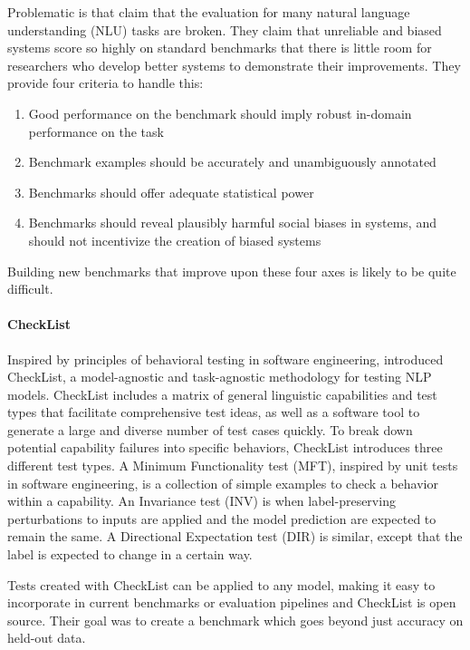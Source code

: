 \documentclass[
]{krantz}
\providecommand{\tightlist}{%
  \setlength{\itemsep}{0pt}\setlength{\parskip}{0pt}}
\begin{document}
Problematic is that \citet{bowman2021will} claim that the evaluation for many natural language understanding (NLU) tasks are broken. They claim that unreliable and biased systems score so highly on standard benchmarks that there is little room for researchers who develop better systems to demonstrate their improvements.
They provide four criteria to handle this:

\begin{enumerate}
\def\labelenumi{\arabic{enumi}.}
\tightlist
\item
  Good performance on the benchmark should imply robust in-domain performance on the task
\item
  Benchmark examples should be accurately and unambiguously annotated
\item
  Benchmarks should offer adequate statistical power
\item
  Benchmarks should reveal plausibly harmful social biases in systems, and should not incentivize the creation of biased systems
\end{enumerate}

Building new benchmarks that improve upon these four axes is likely to be quite difficult.

\hypertarget{checklist}{%
\paragraph{CheckList}\label{checklist}}

Inspired by principles of behavioral testing in software engineering, \citet{ribeiro2020beyond} introduced CheckList, a model-agnostic and task-agnostic methodology for testing NLP models. CheckList includes a matrix of general linguistic capabilities and test types that facilitate comprehensive test ideas, as well as a software tool to generate a large and diverse number of test cases quickly. To break down potential capability failures into specific behaviors, CheckList introduces three different test types. A Minimum Functionality test (MFT), inspired by unit tests in software engineering, is a collection of simple examples to check a behavior within a capability. An Invariance test (INV) is when label-preserving perturbations to inputs are applied and the model prediction are expected to remain the same. A Directional Expectation test (DIR) is similar, except that the label is expected to change in a certain way.

Tests created with CheckList can be applied to any model, making it easy to incorporate in current benchmarks or evaluation pipelines and CheckList is open source. Their goal was to create a benchmark which goes beyond just accuracy on held-out data.
\end{document}
